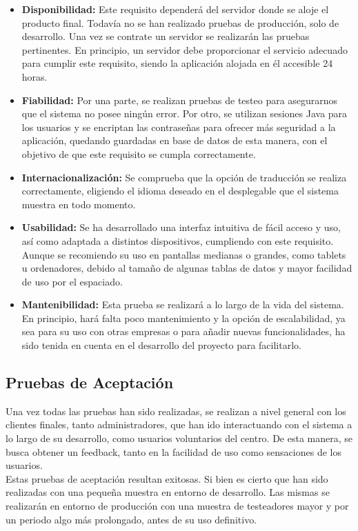 \begin{itemize}
\item \textbf{Disponibilidad:} Este requisito dependerá del servidor donde se aloje el producto final. Todavía no se han realizado pruebas de producción, solo de desarrollo. Una vez se contrate un servidor se realizarán las pruebas pertinentes. En principio, un servidor debe proporcionar el servicio adecuado para cumplir este requisito, siendo la aplicación alojada en él accesible 24 horas.
\item \textbf{Fiabilidad:} Por una parte, se realizan pruebas de testeo para asegurarnos que el sistema no posee ningún error. Por otro, se utilizan sesiones Java para los usuarios y se encriptan las contraseñas para ofrecer más seguridad a la aplicación, quedando guardadas en base de datos de esta manera, con el objetivo de que este requisito se cumpla correctamente.
\item \textbf{Internacionalización:} Se comprueba que la opción de traducción se realiza correctamente, eligiendo el idioma deseado en el desplegable que el sistema muestra en todo momento. 
\item \textbf{Usabilidad:} Se ha desarrollado una interfaz intuitiva de fácil acceso y uso, así como adaptada a distintos dispositivos, cumpliendo con este requisito. Aunque se recomiendo su uso en pantallas medianas o grandes, como tablets u ordenadores, debido al tamaño de algunas tablas de datos y mayor facilidad de uso por el espaciado.
\item \textbf{Mantenibilidad:} Esta prueba se realizará a lo largo de la vida del sistema. En principio, hará falta poco mantenimiento y la opción de escalabilidad, ya sea para su uso con otras empresas o para añadir nuevas funcionalidades, ha sido tenida en cuenta en el desarrollo del proyecto para facilitarlo.
\end{itemize}

\subsection{Pruebas de Aceptación}

Una vez todas las pruebas han sido realizadas, se realizan a nivel general con los clientes finales, tanto administradores, que han ido interactuando con el sistema a lo largo de su desarrollo, como usuarios voluntarios del centro. De esta manera, se busca obtener un feedback, tanto en la facilidad de uso como sensaciones de los usuarios. \\ 

Estas pruebas de aceptación resultan exitosas. Si bien es cierto que han sido realizadas con una pequeña muestra en entorno de desarrollo. Las mismas se realizarán en entorno de producción con una muestra de testeadores mayor y por un periodo algo más prolongado, antes de su uso definitivo.

